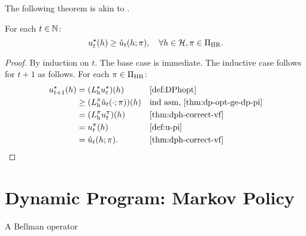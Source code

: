 The following theorem is akin to \citep[theorem~4.3.2]{Puterman2005}.
\begin{theorem}\label{thm:dph-opt-vf-opt}
For each $t\in \mathbb{N}$:
  \[
    u^{\star}_t(h)
    \ge 
    \hat{u}_t(h; \pi), \quad \forall h\in \mathcal{H}, \pi\in \Pi_{\mathrm{HR}}.
  \]
\end{theorem}
\begin{proof}
  By induction on $t$. The base case is immediate. The inductive case follows for $t+1$ as follows. For each $\pi\in \Pi_{\mathrm{HR}}$:
  \begin{align*}
    u_{t+1}\opt(h)
    &= (L_{\mathrm{h}}\opt u_t\opt)(h) && \text{\cref{def:DPhopt}} \\
    &\ge (L_{\mathrm{h}}^{\pi} \hat{u}_t(\cdot; \pi))(h) && \text{ind asm, \cref{thm:dp-opt-ge-dp-pi}} \\
    &= (L_{\mathrm{h}}^{\pi} u_t^{\pi})(h) && \text{\cref{thm:dph-correct-vf}} \\
    &= u_t^{\pi}(h) && \text{\cref{def:u-pi}} \\
    &= \hat{u}_t(h; \pi). && \text{\cref{thm:dph-correct-vf}} \\
  \end{align*}
\end{proof}

\section{Dynamic Program: Markov Policy}

\begin{definition}
A Bellman operator   
\end{definition}







\label{def:uopt}
